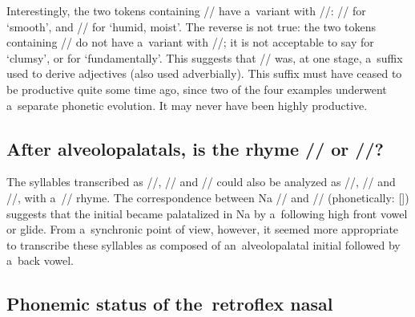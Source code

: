 			Interestingly, the two tokens containing // have a~variant with //:
			// for ‘smooth’, and // for ‘humid, moist’. The reverse is not true:
			the two tokens containing // do not have a~variant with //; it is not acceptable to
			say  for ‘clumsy’, or  for ‘fundamentally’. This suggests
			that // was, at one stage, a~suffix used to derive adjectives (also used adverbially).
			This suffix must have ceased to be productive quite some time ago, since two of the four examples
			underwent a~separate phonetic evolution. It may never have been highly productive.
			

			\subsection{After alveolopalatals, is the rhyme // or //?}
			\label{sec:afteralveolopalatalstwooptionsforanalysisand}
			
			The syllables transcribed as //, // and // could also be analyzed as
			//, // and //, with a~// rhyme. The correspondence between
			Na // and  // (phonetically: []) suggests that the initial became
			palatalized in Na by a~following high front vowel or glide. From a~synchronic point of view,
			however, it seemed more appropriate to transcribe these syllables as composed of an~alveolopalatal
			initial followed by a~back vowel.
			
			
			\subsection{Phonemic status of the~retroflex nasal}
			\label{sec:apossiblereanalysisdispensingwithaphonemicretroflexnasal}
			
